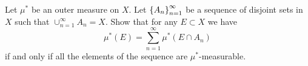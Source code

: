 \documentclass[11pt, a4paper]{article}
\begin{document}
\begin{exercise}
  Let $\mu^*$ be an outer measure on $X$.
  Let $\set{A_n}_{n=1}^{\infty}$ be a sequence of disjoint sets in $X$ such that
  $\cup_{n=1}^{\infty} A_n = X$.
  Show that for any $E \subset X$ we have
  \[
    \mu^*(E) = \sum_{n=1}^{\infty} \mu^*(E \cap A_n)
  \]
  if and only if all the elements of the sequence are $\mu^*$-measurable.
\end{exercise}
\begin{solution}
  
\end{solution}
\end{document}
